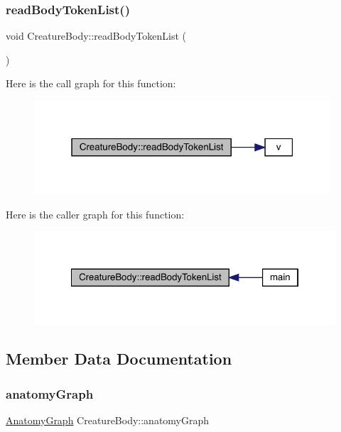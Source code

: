 \subsubsection{\texorpdfstring{read\+Body\+Token\+List()}{readBodyTokenList()}}
{\footnotesize\ttfamily void Creature\+Body\+::read\+Body\+Token\+List (\begin{DoxyParamCaption}{ }\end{DoxyParamCaption})}

Here is the call graph for this function\+:
\nopagebreak
\begin{figure}[H]
\begin{center}
\leavevmode
\includegraphics[width=313pt]{class_creature_body_a52d765dd974e81a549fd0cb27b355cf2_cgraph}
\end{center}
\end{figure}
Here is the caller graph for this function\+:
\nopagebreak
\begin{figure}[H]
\begin{center}
\leavevmode
\includegraphics[width=322pt]{class_creature_body_a52d765dd974e81a549fd0cb27b355cf2_icgraph}
\end{center}
\end{figure}


\subsection{Member Data Documentation}
\mbox{\label{class_creature_body_aa0fc6dc283a463e31f34c0ce9c2f1182}} 
\subsubsection{\texorpdfstring{anatomy\+Graph}{anatomyGraph}}
{\footnotesize\ttfamily \mbox{\hyperlink{_body_graph_8hpp_ab01b157c2e143191570b012d275fbf0d}{Anatomy\+Graph}} Creature\+Body\+::anatomy\+Graph}

